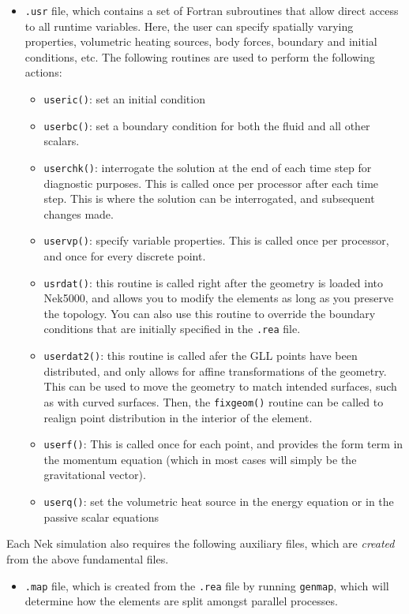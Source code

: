 \documentclass[10pt]{article}
\numberwithin{equation}{section} %
\begin{document}
\begin{itemize}
\item {\tt .usr} file, which contains a set of Fortran subroutines that allow direct access to all runtime variables. Here, the user can specify spatially varying properties, volumetric heating sources, body forces, boundary and initial conditions, etc. The following routines are used to perform the following actions:
	\begin{itemize}
	\item {\tt useric()}: set an initial condition
	\item {\tt userbc()}: set a boundary condition for both the fluid and all other scalars. 
	\item {\tt userchk()}: interrogate the solution at the end of each time step for diagnostic purposes. This is called once per processor after each time step. This is where the solution can be interrogated, and subsequent changes made.
	\item {\tt uservp()}: specify variable properties. This is called once per processor, and once for every discrete point.
	\item {\tt usrdat()}: this routine is called right after the geometry is loaded into Nek5000, and allows you to modify the elements as long as you preserve the topology. You can also use this routine to override the boundary conditions that are initially specified in the {\tt .rea} file. 
	\item {\tt userdat2()}: this routine is called afer the GLL points have been distributed, and only allows for affine transformations of the geometry. This can be used to move the geometry to match intended surfaces, such as with curved surfaces. Then, the {\tt fixgeom()} routine can be called to realign point distribution in the interior of the element.
	\item {\tt userf()}: This is called once for each point, and provides the form term in the momentum equation (which in most cases will simply be the gravitational vector). 
	\item {\tt userq()}: set the volumetric heat source in the energy equation or in the passive scalar equations
	\end{itemize}
\end{itemize}

Each Nek simulation also requires the following auxiliary files, which are {\it created} from the above fundamental files.

\begin{itemize}
\item {\tt .map} file, which is created from the {\tt .rea} file by running {\tt genmap}, which will determine how the elements are split amongst parallel processes. 
\end{itemize}
\end{document}
